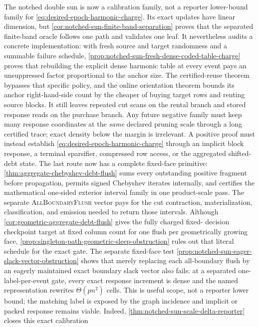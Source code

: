The notched double sun is now a calibration family, not a reporter lower-bound
family for \cref{eq:desired-epoch-harmonic-charge}.  Its exact updates have
linear dimension, but
\cref{cor:notched-sun-finite-band-separation} proves that the separated
finite-band oracle follows one path and validates one leaf.  It nevertheless
audits a concrete implementation: with fresh source and target randomness and
a summable failure schedule,
\cref{prop:notched-sun-fresh-dense-coded-table-charge} proves that rebuilding
the explicit dense harmonic table at every event pays an unsuppressed factor
proportional to the anchor size.  The certified-reuse theorem bypasses that
specific policy, and the online orientation theorem bounds its anchor
right-hand-side count by the cheaper of buying target rows and renting source
blocks.  It still leaves repeated cut scans on the rental branch and stored
response reads on the purchase branch.  Any future negative family must keep many
response coordinates at the \emph{same} declared pruning scale through a long
certified trace; exact density below the margin is irrelevant.  A positive
proof must instead establish \cref{eq:desired-epoch-harmonic-charge} through
an implicit block response, a terminal sparsifier, compressed row access, or
the aggregated shifted-debt state.  The last route now has a complete
fixed-face primitive: \cref{thm:aggregate-chebyshev-debt-flush} sums every
outstanding positive fragment before propagation, permits signed Chebyshev
iterates internally, and certifies the mathematical one-sided exterior
interval family in one product-scale pass.  The separate
\textsc{AllBoundaryFlush} vector pays for the cut contraction,
materialization, classification, and emission needed to return those
intervals.  Although
\cref{cor:geometric-aggregate-debt-flush} gives the fully charged fixed-
decision checkpoint target at fixed column count for one flush per
geometrically growing face,
\cref{prop:singleton-path-geometric-sleep-obstruction} rules out that literal
schedule for the exact gate.  The separate fixed-face test
\cref{prop:notched-sun-eager-slack-vector-obstruction} shows that merely
replacing each all-boundary flush by an eagerly maintained exact boundary
slack vector also fails: at a separated one-label-per-event gate, every exact
response increment is dense and the named representation rewrites
$\Theta(pn^2)$ cells.  This is useful scope, not a reporter lower bound; the
matching label is exposed by the graph incidence and implicit or packed
response remains viable.  Indeed,
\cref{thm:notched-sun-scale-delta-reporter} closes this exact calibration
